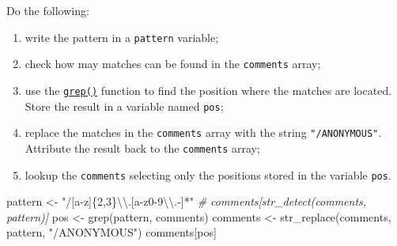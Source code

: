 \documentclass[
]{article}
\newenvironment{Shaded}{\begin{snugshade}}{\end{snugshade}}
\newcommand{\CommentTok}[1]{\textcolor[rgb]{0.56,0.35,0.01}{\textit{#1}}}
\newcommand{\FunctionTok}[1]{\textcolor[rgb]{0.00,0.00,0.00}{#1}}
\newcommand{\NormalTok}[1]{#1}
\newcommand{\OtherTok}[1]{\textcolor[rgb]{0.56,0.35,0.01}{#1}}
\newcommand{\SpecialCharTok}[1]{\textcolor[rgb]{0.00,0.00,0.00}{#1}}
\newcommand{\StringTok}[1]{\textcolor[rgb]{0.31,0.60,0.02}{#1}}
\providecommand{\tightlist}{%
  \setlength{\itemsep}{0pt}\setlength{\parskip}{0pt}}
\begin{document}
Do the following:

\begin{enumerate}
\def\labelenumi{\arabic{enumi}.}
\tightlist
\item
  write the pattern in a \texttt{pattern} variable;
\item
  check how may matches can be found in the \texttt{comments} array;
\item
  use the
  \href{https://www.rdocumentation.org/packages/base/versions/3.6.2/topics/grep}{\texttt{grep()}}
  function to find the position where the matches are located. Store the
  result in a variable named \texttt{pos};
\item
  replace the matches in the \texttt{comments} array with the string
  \texttt{"/ANONYMOUS"}. Attribute the result back to the
  \texttt{comments} array;
\item
  lookup the \texttt{comments} selecting only the positions stored in
  the variable \texttt{pos}.
\end{enumerate}

\begin{Shaded}
\begin{Highlighting}[]
\NormalTok{pattern }\OtherTok{\textless{}{-}} \StringTok{"/[a{-}z]\{2,3\}}\SpecialCharTok{\textbackslash{}\textbackslash{}}\StringTok{.[a{-}z0{-}9}\SpecialCharTok{\textbackslash{}\textbackslash{}}\StringTok{.{-}]*"}
\CommentTok{\# comments[str\_detect(comments, pattern)]}
\NormalTok{pos }\OtherTok{\textless{}{-}} \FunctionTok{grep}\NormalTok{(pattern, comments)}
\NormalTok{comments }\OtherTok{\textless{}{-}} \FunctionTok{str\_replace}\NormalTok{(comments, pattern, }\StringTok{"/ANONYMOUS"}\NormalTok{)}
\NormalTok{comments[pos]}
\end{Highlighting}
\end{Shaded}
\end{document}

